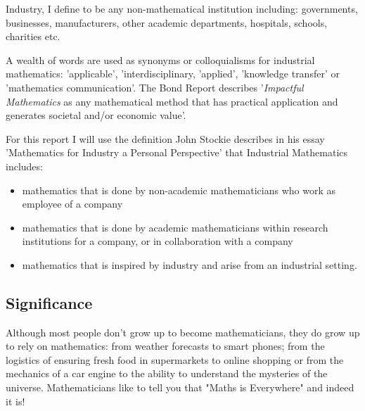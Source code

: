 \documentclass[11pt]{article} %
\begin{document}
	
 Industry,  I define to be any non-mathematical institution including: governments, businesses, manufacturers, other academic departments, hospitals, schools, charities etc. 


		A wealth of words are used as synonyms or colloquialisms for industrial mathematics: 'applicable', 'interdisciplinary, 'applied', 'knowledge transfer' or 'mathematics communication'. The Bond Report \cite{Bond} describes '\textit{Impactful Mathematics} as any mathematical method that has practical application and generates societal and/or economic value'. 
		
		For this report I will use the definition John Stockie describes in his essay 'Mathematics for Industry a Personal Perspective' \cite{Stockie2015} that Industrial Mathematics includes: 
		
	\begin{itemize}
	\item mathematics that is done by non-academic mathematicians who work as employee of a company
	\item mathematics that is done by academic mathematicians within research institutions for a company, or in collaboration with a company
	\item mathematics that is inspired by industry and arise from an industrial setting. 
	\end{itemize}
	
	
	\subsection{Significance \label{significance}}
	
Although most people don't grow up to become mathematicians, they do grow up to rely on mathematics: from weather forecasts to smart phones; from the logistics of ensuring fresh food in supermarkets to online shopping or from the mechanics of a car engine to  the ability to understand the mysteries of the universe. Mathematicians like to tell you that "Maths is Everywhere" and indeed it is! 
\end{document}
